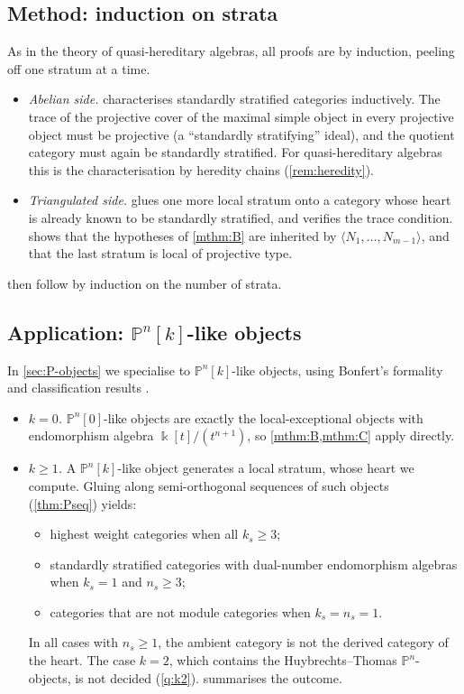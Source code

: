 \documentclass[11pt,reqno]{amsart}
\theoremstyle{plain}
\theoremstyle{definition}
\theoremstyle{remark}
\newcommand{\kk}{\Bbbk}
\newcommand{\thick}[1]{\langle #1\rangle}
\newcommand{\Pn}[2]{\mathbb{P}^{#1}[#2]}
\begin{document}
\subsection{Method: induction on strata}
As in the theory of quasi-hereditary algebras, all proofs are by induction, peeling off one stratum at a time.
\begin{itemize}
\item \emph{Abelian side.}  characterises standardly stratified categories inductively. The trace of the projective cover of the maximal simple object in every projective object must be projective (a ``standardly stratifying'' ideal), and the quotient category must again be standardly stratified. For quasi-hereditary algebras this is the characterisation by heredity chains (\cref{rem:heredity}).
\item \emph{Triangulated side.}  glues one more local stratum onto a category whose heart is already known to be standardly stratified, and verifies the trace condition.  shows that the hypotheses of \cref{mthm:B} are inherited by $\thick{N_1,\dots,N_{m-1}}$, and that the last stratum is local of projective type.
\end{itemize}
 then follow by induction on the number of strata.

\subsection{Application: \texorpdfstring{$\mathbb{P}^n[k]$}{Pn[k]}-like objects}
In \cref{sec:P-objects} we specialise to $\Pn nk$-like objects, using Bonfert's formality and classification results \cite{Bonf26}.
\begin{itemize}
\item \emph{$k=0$.} $\Pn n0$-like objects are exactly the local-exceptional objects with endomorphism algebra $\kk[t]/(t^{n+1})$, so \cref{mthm:B,mthm:C} apply directly.
\item \emph{$k\ge1$.} A $\Pn nk$-like object generates a local stratum, whose heart we compute. Gluing along semi-orthogonal sequences of such objects (\cref{thm:Pseq}) yields:
\begin{itemize}
\item highest weight categories when all $k_s\ge3$;
\item standardly stratified categories with dual-number endomorphism algebras when $k_s=1$ and $n_s\ge3$;
\item categories that are not module categories when $k_s=n_s=1$.
\end{itemize}
In all cases with $n_s\ge1$, the ambient category is not the derived category of the heart. The case $k=2$, which contains the Huybrechts--Thomas $\mathbb{P}^n$-objects, is not decided (\cref{q:k2}).  summarises the outcome.
\end{itemize}
\end{document}
